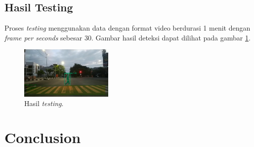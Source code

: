 \documentclass[conference]{IEEEtran}
\begin{document}
	\subsection{Hasil Testing}
	\vspace{1ex}
	Proses \textit{testing} menggunakan data dengan format video berdurasi 1 menit dengan \textit{frame per seconds} sebesar 30. Gambar hasil deteksi dapat dilihat pada gambar \ref{fig:4}.
	\vspace{1ex}
	\begin{figure}[h!] \centering
		\includegraphics[width=0.4\textwidth]{img/hasil.png}
		\caption{Hasil \textit{testing}.}
		\label{fig:4}
	\end{figure}
	
	\section{Conclusion}
	
	
	
	
\end{document}
